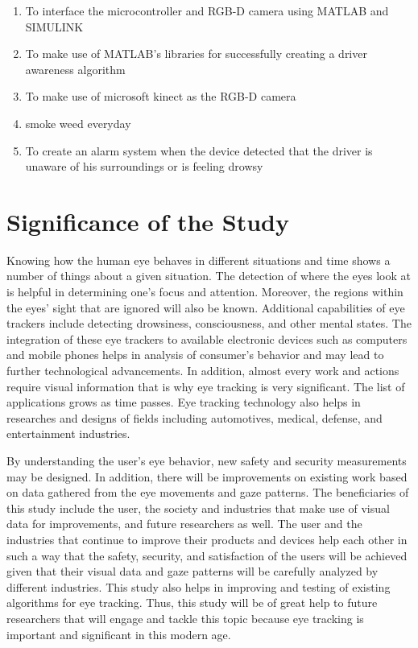 \begin{enumerate}
	
	\item To interface the microcontroller and RGB-D camera using MATLAB and SIMULINK
	
	\item To make use of MATLAB’s libraries for successfully creating a driver awareness algorithm 
	
	\item To make use of microsoft kinect as the RGB-D camera
	
	\item smoke weed everyday
	
	\item To create an alarm system when the device detected that the driver is unaware of his surroundings or is feeling drowsy
	
\end{enumerate}



\section{Significance of the Study}

Knowing how the human eye behaves in different situations and time shows a number of things about a given situation. The detection of where the eyes look at is helpful in determining one’s focus and attention. Moreover, the regions within the eyes’ sight that are ignored will also be known. Additional capabilities of eye trackers include detecting drowsiness, consciousness, and other mental states. The integration of these eye trackers to available electronic devices such as computers and mobile phones helps in analysis of consumer’s behavior and may lead to further technological advancements. In addition, almost every work and actions require visual information that is why eye tracking is very significant. The list of applications grows as time passes. Eye tracking technology also helps in researches and designs of fields including automotives, medical, defense, and entertainment industries. 

By understanding the user’s eye behavior, new safety and security measurements may be designed. In addition, there will be improvements on existing work based on data gathered from the eye movements and gaze patterns. The beneficiaries of this study include the user, the society and industries that make use of visual data for improvements, and future researchers as well. The user and the industries that continue to improve their products and devices help each other in such a way that the safety, security, and satisfaction of the users will be achieved given that their visual data and gaze patterns will be carefully analyzed by different industries. This study also helps in improving and testing of existing algorithms for eye tracking. Thus, this study will be of great help to future researchers that will engage and tackle this topic because eye tracking is important and significant in this modern age. 




